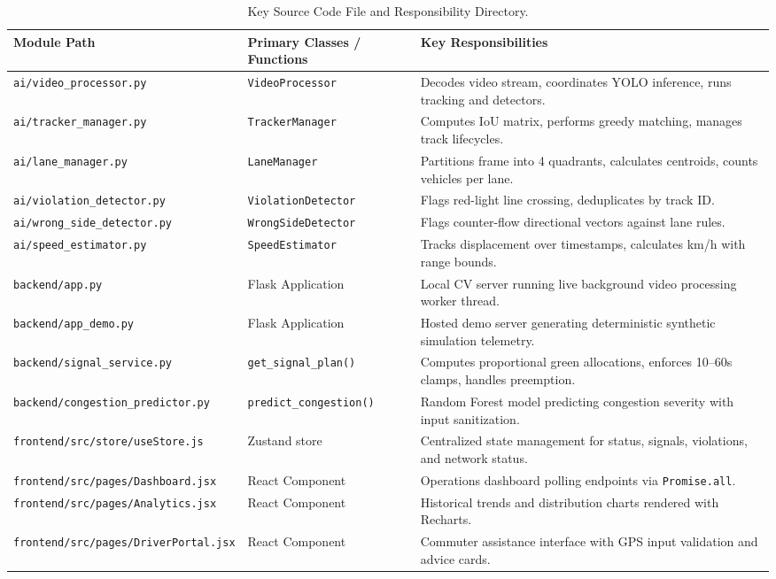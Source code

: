 \begin{table}[H]
\centering
\small
\begin{tabularx}{\textwidth}{l p{4.2cm} X}
\toprule
\textbf{Module Path} & \textbf{Primary Classes / Functions} & \textbf{Key Responsibilities} \\
\midrule
\texttt{ai/video\_processor.py} & \texttt{VideoProcessor} & Decodes video stream, coordinates YOLO inference, runs tracking and detectors. \\
\texttt{ai/tracker\_manager.py} & \texttt{TrackerManager} & Computes IoU matrix, performs greedy matching, manages track lifecycles. \\
\texttt{ai/lane\_manager.py} & \texttt{LaneManager} & Partitions frame into 4 quadrants, calculates centroids, counts vehicles per lane. \\
\texttt{ai/violation\_detector.py} & \texttt{ViolationDetector} & Flags red-light line crossing, deduplicates by track ID. \\
\texttt{ai/wrong\_side\_detector.py} & \texttt{WrongSideDetector} & Flags counter-flow directional vectors against lane rules. \\
\texttt{ai/speed\_estimator.py} & \texttt{SpeedEstimator} & Tracks displacement over timestamps, calculates km/h with range bounds. \\
\texttt{backend/app.py} & Flask Application & Local CV server running live background video processing worker thread. \\
\texttt{backend/app\_demo.py} & Flask Application & Hosted demo server generating deterministic synthetic simulation telemetry. \\
\texttt{backend/signal\_service.py} & \texttt{get\_signal\_plan()} & Computes proportional green allocations, enforces 10--60s clamps, handles preemption. \\
\texttt{backend/congestion\_predictor.py} & \texttt{predict\_congestion()} & Random Forest model predicting congestion severity with input sanitization. \\
\texttt{frontend/src/store/useStore.js} & Zustand store & Centralized state management for status, signals, violations, and network status. \\
\texttt{frontend/src/pages/Dashboard.jsx} & React Component & Operations dashboard polling endpoints via \texttt{Promise.all}. \\
\texttt{frontend/src/pages/Analytics.jsx} & React Component & Historical trends and distribution charts rendered with Recharts. \\
\texttt{frontend/src/pages/DriverPortal.jsx} & React Component & Commuter assistance interface with GPS input validation and advice cards. \\
\bottomrule
\end{tabularx}
\caption{Key Source Code File and Responsibility Directory.}
\label{tab:glossary_source_map}
\end{table}

